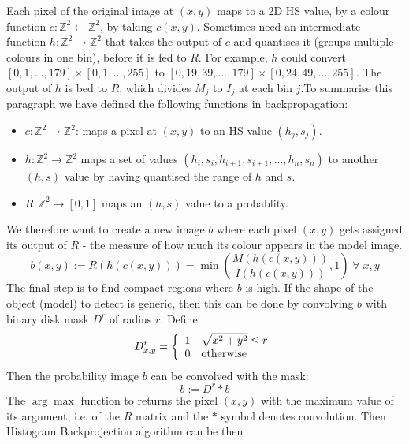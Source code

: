\documentclass[a4paper]{article}
\begin{document}
Each pixel of the original image at $(x,y)$ maps to a 2D HS value, by a colour function $c: \mathbb{Z}^2 \leftarrow \mathbb{Z}^2$, by taking $c(x,y)$. Sometimes need an intermediate function $h:\mathbb{Z}^2 \rightarrow \mathbb{Z}^2$ that takes the output of $c$ and quantises it (groups multiple colours in one bin), before it is fed to $R$. For example, $h$ could convert $[0,1,\ldots,179] \times [0,1,\ldots,255]$ to $[0, 19, 39, \ldots,179] \times [0, 24, 49, \ldots, 255]$. The output of $h$ is bed to $R$, which divides $M_j$ to $I_j$ at each bin $j$.To summarise this paragraph we have  defined the following functions in backpropagation:
\begin{itemize}
    \item $c: \mathbb{Z}^2 \rightarrow \mathbb{Z}^2$: maps a pixel at $(x,y)$ to an HS value $(h_j,s_j)$.
    \item $h: \mathbb{Z}^2 \rightarrow \mathbb{Z}^2$ maps a set of values $(h_i,s_i,h_{i+1},s_{i+1},\ldots,h_n,s_n)$ to another $(h,s)$ value by having quantised the range of $h$ and $s$.
    \item $R: \mathbb{Z}^2 \rightarrow [0,1]$ maps an $(h,s)$ value to a probablity.
\end{itemize}
We therefore want to create a new image $b$ where each pixel $(x,y)$ gets assigned its output of $R$ - the measure of how much its colour appears in the model image. 
\begin{equation}
    b(x,y) := R\left(h\left(c(x,y)\right)\right)=
    \min\left(\frac{M\left(h\left(c(x,y)\right)\right)}{I\left(h\left(c(x,y)\right)\right)},1\right) \; \forall \; x,y
\end{equation}
The final step is to find compact regions where $b$ is high. If the shape of the object (model) to detect is generic, then this can be done by convolving $b$ with binary disk mask $D^r$ of radius $r$. Define:
\begin{equation}
    D_{x,y}^r = \left\{
\begin{array}{ll}
      1 & \sqrt{x^2+y^2} \leq r \\
      0 & \textup{otherwise}\\
\end{array} 
\right. 
\end{equation}
Then the probability image $b$ can be convolved with the mask:
\begin{equation}
    b := D^r \ast b
\end{equation}
The $\arg \max$ function to returns the pixel $(x, y)$ with
the maximum value of its argument, i.e. of the $R$ matrix and the $\ast$ symbol denotes convolution. Then Histogram Backprojection algorithm can be then
\end{document}
